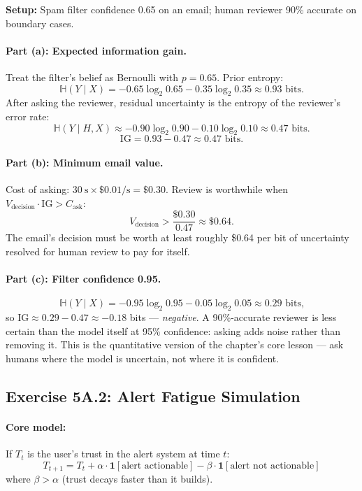 \textbf{Setup:} Spam filter confidence 0.65 on an email; human reviewer 90\% accurate on boundary cases.

\paragraph{Part (a): Expected information gain.}
Treat the filter's belief as Bernoulli with $p = 0.65$. Prior entropy:
\[
\mathbb{H}(Y \mid X) = -0.65 \log_2 0.65 - 0.35 \log_2 0.35 \approx 0.93 \text{ bits.}
\]
After asking the reviewer, residual uncertainty is the entropy of the reviewer's error rate:
\[
\mathbb{H}(Y \mid H, X) \approx -0.90 \log_2 0.90 - 0.10 \log_2 0.10 \approx 0.47 \text{ bits.}
\]
\[
\text{IG} = 0.93 - 0.47 \approx 0.47 \text{ bits.}
\]

\paragraph{Part (b): Minimum email value.}
Cost of asking: $30~\text{s} \times \$0.01/\text{s} = \$0.30$. Review is worthwhile when $V_\text{decision} \cdot \text{IG} > C_\text{ask}$:
\[
V_\text{decision} > \frac{\$0.30}{0.47} \approx \$0.64.
\]
The email's decision must be worth at least roughly \$0.64 per bit of uncertainty resolved for human review to pay for itself.

\paragraph{Part (c): Filter confidence 0.95.}
\[
\mathbb{H}(Y \mid X) = -0.95 \log_2 0.95 - 0.05 \log_2 0.05 \approx 0.29 \text{ bits,}
\]
so $\text{IG} \approx 0.29 - 0.47 \approx -0.18$ bits --- \emph{negative}. A 90\%-accurate reviewer is less certain than the model itself at 95\% confidence: asking adds noise rather than removing it. This is the quantitative version of the chapter's core lesson --- ask humans where the model is uncertain, not where it is confident.

\subsection{Exercise 5A.2: Alert Fatigue Simulation}

\paragraph{Core model:} If $T_t$ is the user's trust in the alert system at time $t$:
\[
T_{t+1} = T_t + \alpha \cdot \mathbf{1}[\text{alert actionable}] - \beta \cdot \mathbf{1}[\text{alert not actionable}]
\]
where $\beta > \alpha$ (trust decays faster than it builds).

